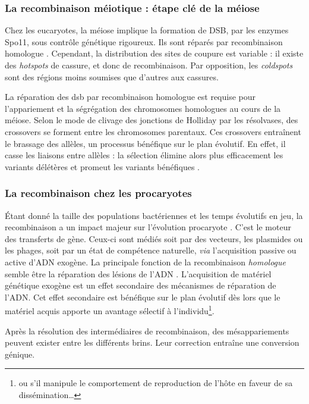 \documentclass[11pt, oneside]{scrartcl}
\begin{document}
\subsubsection{La recombinaison méiotique : étape clé de la méiose}
\label{sec:orgheadline3}

Chez les eucaryotes, la méiose implique la formation de DSB, par les enzymes
Spo11, sous contrôle génétique rigoureux. Ils sont réparés par recombinaison
homologue \cite{chapman_playing_2012}. Cependant, la distribution des sites de
coupure est variable : il existe des \emph{hotspots} de cassure, et donc de
recombinaison. Par opposition, les \emph{coldspots} sont des régions moins soumises
que d'autres aux cassures.

La réparation des \ac{dsb} par recombinaison homologue est requise pour
l'appariement et la ségrégation des chromosomes homologues au cours de la
méiose. Selon le mode de clivage des jonctions de Holliday par les résolvases,
des crossovers se forment entre les chromosomes parentaux. Ces crossovers
entraînent le brassage des allèles, un processus bénéfique sur le plan
évolutif\cite{webster_direct_2012}. En effet, il casse les liaisons entre
allèles : la sélection élimine alors plus efficacement les variants délétères et
promeut les variants bénéfiques \cite{otto_resolving_2002}.

\subsubsection{La recombinaison chez les procaryotes}
\label{sec:orgheadline4}

Étant donné la taille des populations bactériennes et les temps évolutifs en
jeu, la recombinaison a un impact majeur sur l'évolution procaryote
\cite{didelot_impact_2010}. C'est le moteur des transferts de gène. Ceux-ci sont
médiés soit par des vecteurs, les plasmides ou les phages, soit par un état de
compétence naturelle, \emph{via} l'acquisition passive ou active d'ADN exogène. La
principale fonction de la recombinaison \emph{homologue} semble être la réparation
des lésions de l'ADN \cite{fall_horizontal_2007}. L'acquisition de matériel
génétique exogène est un effet secondaire des mécanismes de réparation de l'ADN.
Cet effet secondaire est bénéfique sur le plan évolutif dès lors que le matériel
acquis apporte un avantage sélectif à l'individu\footnote{ou s'il manipule le
comportement de reproduction de l'hôte en faveur de sa dissémination…}.

\begin{transition}
Après la résolution des intermédiaires de recombinaison, des mésappariements
peuvent exister entre les différents brins. Leur correction entraîne une
conversion génique.
\end{transition}
\end{document}
